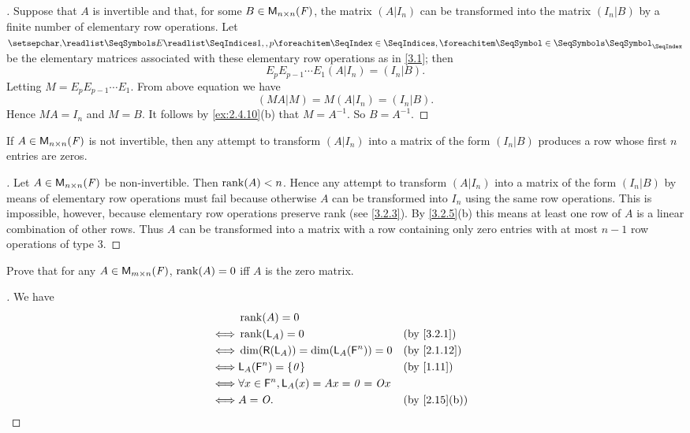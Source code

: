 \begin{proof}[]
  Suppose that \(A\) is invertible and that, for some \(B \in \mathsf{M}_{{n} \times n}({\mathit{F}})\), the matrix \((A | I_n)\) can be transformed into the matrix \((I_n | B)\) by a finite number of elementary row operations.
  Let \(\seq{E}{1,,p}\) be the elementary matrices associated with these elementary row operations as in \cref{3.1};
  then
  \[
    E_p E_{p - 1} \cdots E_1 (A | I_n) = (I_n | B).
  \]
  Letting \(M = E_p E_{p - 1} \cdots E_1\).
  From above equation we have
  \[
    (MA | M) = M (A | I_n) = (I_n | B).
  \]
  Hence \(MA = I_n\) and \(M = B\).
  It follows by \cref{ex:2.4.10}(b) that \(M = A^{-1}\).
  So \(B = A^{-1}\).
\end{proof}

\begin{cor}\label{3.2.10}
  If \(A \in \mathsf{M}_{{n} \times n}({\mathit{F}})\) is not invertible, then any attempt to transform \((A | I_n)\) into a matrix of the form \((I_n | B)\) produces a row whose first \(n\) entries are zeros.
\end{cor}

\begin{proof}[]
  Let \(A \in \mathsf{M}_{{n} \times n}({\mathit{F}})\) be non-invertible.
  Then \(\rk{A} < n\).
  Hence any attempt to transform \((A | I_n)\) into a matrix of the form \((I_n | B)\) by means of elementary row operations must fail because otherwise \(A\) can be transformed into \(I_n\) using the same row operations.
  This is impossible, however, because elementary row operations preserve rank
  (see \cref{3.2.3}).
  By \cref{3.2.5}(b) this means at least one row of \(A\) is a linear combination of other rows.
  Thus \(A\) can be transformed into a matrix with a row containing only zero entries with at most \(n - 1\) row operations of type 3.
\end{proof}

\exercisesection

\setcounter{ex}{2}
\begin{ex}\label{ex:3.2.3}
  Prove that for any \(A \in \mathsf{M}_{{m} \times n}({\mathit{F}})\), \(\rk{A} = 0\) iff \(A\) is the zero matrix.
\end{ex}

\begin{proof}[]
  We have
  \begin{align*}
         & \rk{A} = 0                                                                         \\
    \iff & \rk{\L_A} = 0                                      &  & \text{(by \cref{3.2.1})}   \\
    \iff & \dim(\rg{\L_A}) = \dim(\L_A(\vs{F}^n)) = 0         &  & \text{(by \cref{2.1.12})}  \\
    \iff & \L_A(\vs{F}^n) = \set{\zv}                         &  & \text{(by \cref{1.11})}    \\
    \iff & \forall x \in \vs{F}^n, \L_A(x) = Ax = \zv = \zm x                                 \\
    \iff & A = \zm.                                           &  & \text{(by \cref{2.15}(b))}
  \end{align*}
\end{proof}

